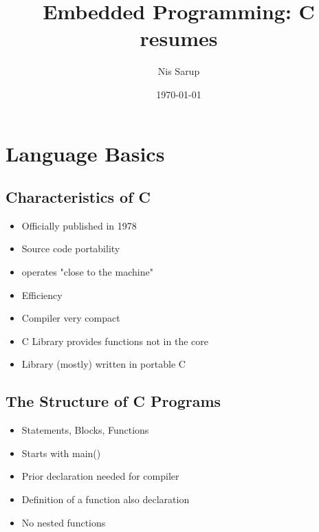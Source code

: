 \documentclass[a4wide,10pt]{article}
\begin{document}
\title{Embedded Programming: C resumes}
\author{Nis Sarup}
\date{\today}
\maketitle

	\section{Language Basics} %
	\label{sec:language_basics}
		\subsection{Characteristics of C} %
		\label{sub:characteristics_of_c}
			\begin{itemize}
				\item Officially published in 1978
				\item Source code portability
				\item operates "close to the machine"
				\item Efficiency
				\item Compiler very compact
				\item C Library provides functions not in the core
				\item Library (mostly) written in portable C
			\end{itemize}
		
		\subsection{The Structure of C Programs} %
		\label{sub:the_structure_of_c_programs}
			\begin{itemize}
				\item Statements, Blocks, Functions
				\item Starts with main()
				\item Prior declaration needed for compiler
				\item Definition of a function also declaration
				\item No nested functions
			\end{itemize}
		
\end{document}
